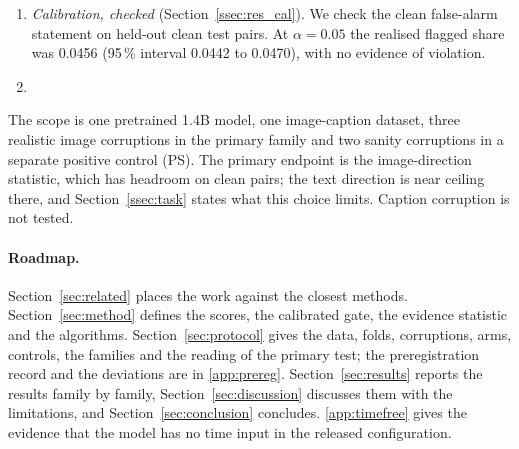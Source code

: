 \begin{enumerate}
but is near chance on JPEG and Gaussian noise (0.561 and 0.503).
On noise it is below a one-pass score without finetuning (0.607; the marginal 95\,\% intervals, 0.493--0.513 and 0.597--0.618, do
not overlap; no paired test was run), and on JPEG the two overlap (0.561, 0.547--0.575, against 0.581, 0.569--0.593).
In the preregistered comparison it is below a texture score whose sign was chosen on the same items (0.756 and 0.768), so the
preregistered falsifier for the score was met.
\item \emph{Calibration, checked} (Section~\ref{ssec:res_cal}). We check the clean false-alarm statement on held-out clean test
pairs.
At $\alpha=0.05$ the realised flagged share was 0.0456 (95\,\% interval 0.0442 to 0.0470), with no evidence of violation.
\item {}
\end{enumerate}
The scope is one pretrained 1.4B model, one image-caption dataset, three realistic image corruptions in the primary family and
two sanity corruptions in a separate positive control (PS).
The primary endpoint is the image-direction statistic, which has headroom on clean pairs; the text direction is near ceiling
there, and Section~\ref{ssec:task} states what this choice limits.
Caption corruption is not tested.


\paragraph{Roadmap.}
Section~\ref{sec:related} places the work against the closest methods.
Section~\ref{sec:method} defines the scores, the calibrated gate, the evidence statistic and the algorithms.
Section~\ref{sec:protocol} gives the data, folds, corruptions, arms, controls, the families and the reading of the primary test;
the preregistration record and the deviations are in \ref{app:prereg}.
Section~\ref{sec:results} reports the results family by family, Section~\ref{sec:discussion} discusses them with the limitations,
and Section~\ref{sec:conclusion} concludes.
\ref{app:timefree} gives the evidence that the model has no time input in the released configuration.
